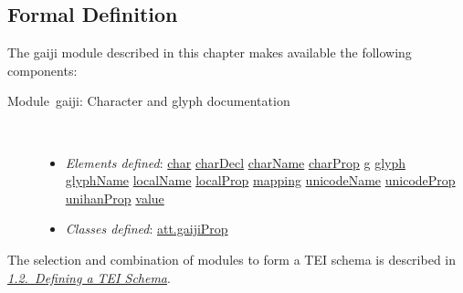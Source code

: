 \subsection[{Formal Definition}]{Formal Definition}\label{WSD-DEF}\par
The gaiji module described in this chapter makes available the following components: \begin{description}

\item[{Module gaiji: Character and glyph documentation}]\hspace{1em}\hfill\linebreak
\mbox{}\\[-10pt] \begin{itemize}
\item {\itshape Elements defined}: \hyperref[TEI.char]{char} \hyperref[TEI.charDecl]{charDecl} \hyperref[TEI.charName]{charName} \hyperref[TEI.charProp]{charProp} \hyperref[TEI.g]{g} \hyperref[TEI.glyph]{glyph} \hyperref[TEI.glyphName]{glyphName} \hyperref[TEI.localName]{localName} \hyperref[TEI.localProp]{localProp} \hyperref[TEI.mapping]{mapping} \hyperref[TEI.unicodeName]{unicodeName} \hyperref[TEI.unicodeProp]{unicodeProp} \hyperref[TEI.unihanProp]{unihanProp} \hyperref[TEI.value]{value}
\item {\itshape Classes defined}: \hyperref[TEI.att.gaijiProp]{att.gaijiProp}
\end{itemize} 
\end{description}  The selection and combination of modules to form a TEI schema is described in \textit{\hyperref[STIN]{1.2.\ Defining a TEI Schema}}.